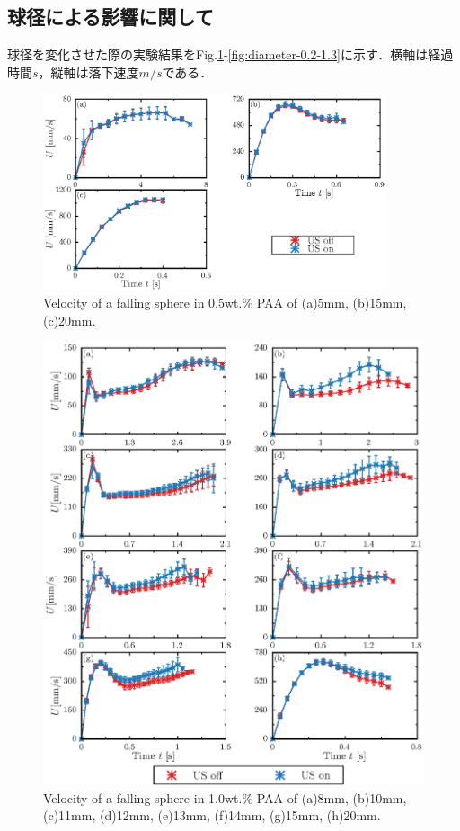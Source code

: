 \subsection{球径による影響に関して}

球径を変化させた際の実験結果をFig.\ref{fig:diameter-0.5}-\ref{fig:diameter-0.2-1.3}に示す．横軸は経過時間$s$，縦軸は落下速度$m/s$である．

\begin{figure}[H]
    \centering
    \includegraphics[width=0.9\textwidth]{X-Appendix/diameter-0.5/diameter.eps}
    \caption{Velocity of a falling sphere in 0.5wt.\% PAA of (a)5mm, (b)15mm, (c)20mm.}
    \label{fig:diameter-0.5}
\end{figure}

\begin{figure}[H]
    \centering
    \includegraphics[width=1\textwidth]{X-Appendix/diameter/diameter.eps}
    \caption{Velocity of a falling sphere in 1.0wt.\% PAA of (a)8mm, (b)10mm, (c)11mm, (d)12mm, (e)13mm, (f)14mm, (g)15mm, (h)20mm.}
    \label{fig:diameter}
\end{figure}

